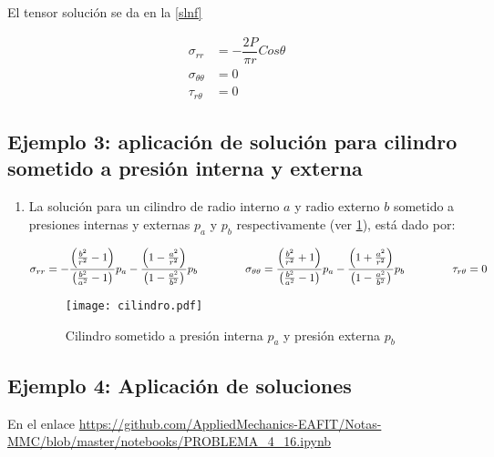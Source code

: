 \documentclass[../notas medios.tex]{subfiles}
\begin{document}
El tensor solución se da en la \cref{slnf}

\begin{equation}
\begin{split}
{ \sigma_{rr}} & = -\dfrac{2P}{\pi r} Cos \theta \\
{\sigma_{\theta\theta}}  &= 0\\
{\tau_{r\theta}}&= 0
\end{split}
\label{slnf}
\end{equation}

\subsection*{Ejemplo 3: aplicación de solución para cilindro sometido a presión interna y externa}

\begin{enumerate} 

\item La solución para un cilindro de radio interno $a$ y radio externo $b$ sometido a presiones internas y externas $p_a$ y $p_b$ respectivamente (ver \cref{cilindro}), está dado por:

\begin{equation*}
\sigma _{rr}  =  - \frac{{\left( {\frac{{{b^2}}}{{{r^2}}} - 1} \right)}}{{\left( {\frac{{{b^2}}}{{{a^2}}} - 1} \right)}}{p_a} - \frac{{\left( {1 - \frac{{{a^2}}}{{{r^2}}}} \right)}}{{\left( {1 - \frac{{{a^2}}}{{{b^2}}}} \right)}}{p_b} \hspace{1.5cm}
\sigma _{\theta \theta } = \frac{{\left( {\frac{{{b^2}}}{{{r^2}}} + 1} \right)}}{{\left( {\frac{{{b^2}}}{{{a^2}}} - 1} \right)}}{p_a} - \frac{{\left( {1 + \frac{{{a^2}}}{{{r^2}}}} \right)}}{{\left( {1 - \frac{{{a^2}}}{{{b^2}}}} \right)}}{p_b} \hspace{1.5cm}
\tau _{r\theta} = 0
\label{slnc}
\end{equation*}

\begin{figure}[H]
\centering
	\texttt{[image: cilindro.pdf]}
	\caption{Cilindro sometido a presión interna $p_a$ y presión externa $p_b$}
	\label{cilindro}
\end{figure}

\end{enumerate}

\subsection*{Ejemplo 4: Aplicación de soluciones}
En el enlace
\small{\url{https://github.com/AppliedMechanics-EAFIT/Notas-MMC/blob/master/notebooks/PROBLEMA_4_16.ipynb}}
\end{document}
